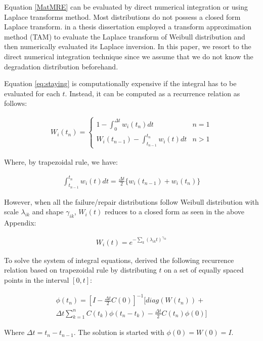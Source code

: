 Equation \ref{MatMRE} can be evaluated by direct numerical integration or using Laplace transforms method. Most distributions do not possess a closed form Laplace transform. \cite{Gulyas2007} in a thesis dissertation employed a transform approximation method (TAM) to evaluate the Laplace transform of Weibull distribution and then numerically evaluated its Laplace inversion. In this paper, we resort to the direct numerical integration technique since we assume that we do not know the degradation distribution beforehand.

Equation \ref{eq:staying} is computationally expensive if the integral has to be evaluated for each $t$. Instead, it can be computed as a recurrence relation as follows:

\begin{align}
W_i(t_n)=\begin{cases}
1 - \int_0 ^ {\Delta t} {w_i(t_n) dt} & n=1 \\
W_i(t_{n-1}) -\int_{t_{n-1}}^{t_n} { w_i(t) dt}    & n > 1
\end{cases}
\end{align}


Where, by trapezoidal rule, we have:

\begin{align}
\int_{t_{n-1}}^{t_n} {w_i(t)}dt = \frac{\Delta t}{2}\{  w_i(t_{n-1}) + w_i(t_n)  \} 
\end{align}

However, when all the failure/repair distributions follow Weibull distribution with scale $\lambda_{ik}$  and shape $\gamma_{ik}$, $W_i(t)$ reduces to a closed form as seen in the above Appendix:

\begin{align}
W_i(t) =  e^{-\sum\limits_{k}{(\lambda_{ik}t)^{\gamma_{ik}}}}
\end{align}

To solve the system of integral equations, \cite{Nunn1977} derived the following recurrence relation based on trapezoidal rule by distributing $t$ on a set of equally spaced points in the interval $[0,t]$:

\begin{eqnarray}
{\phi (t_n )} = [I - \frac{{\Delta t}}{2}C(0)]^{ - 1} [diag(W(t_n )) + \nonumber \\
\Delta t\sum\limits_{k = 1}^n {C(t_k ){\phi (t_n  - t_k )}}  - \frac{{\Delta t}}{2}C(t_n ){\phi (0)}]
\label{TrapCTMRE}
\end{eqnarray}

Where $\Delta t = t_n - t_{n-1}$. The solution is started with ${\phi(0)} = W(0) = I$.

